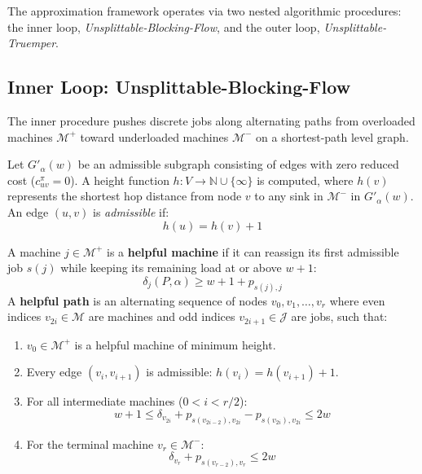 \documentclass{article}
\begin{document}
The approximation framework operates via two nested algorithmic procedures: the inner loop, \emph{Unsplittable-Blocking-Flow}, and the outer loop, \emph{Unsplittable-Truemper}.

\subsection{Inner Loop: Unsplittable-Blocking-Flow}
The inner procedure pushes discrete jobs along alternating paths from overloaded machines $\mathcal{M}^+$ toward underloaded machines $\mathcal{M}^-$ on a shortest-path level graph.

Let $G'_\alpha(w)$ be an admissible subgraph consisting of edges with zero reduced cost ($c_{uv}^\pi = 0$).
A height function $h: V \to \mathbb{N} \cup \{\infty\}$ is computed, where $h(v)$ represents the shortest hop distance from node $v$ to any sink in $\mathcal{M}^-$ in $G'_\alpha(w)$.
An edge $(u, v)$ is \emph{admissible} if:
\begin{equation}
h(u) = h(v) + 1
\end{equation}

\begin{definition}
A machine $j \in \mathcal{M}^+$ is a \textbf{helpful machine} if it can reassign its first admissible job $s(j)$ while keeping its remaining load at or above $w+1$:
\begin{equation}
\delta_j(P, \alpha) \ge w + 1 + p_{s(j), j}
\end{equation}
A \textbf{helpful path} is an alternating sequence of nodes $v_0, v_1, \dots, v_r$ where even indices $v_{2i} \in \mathcal{M}$ are machines and odd indices $v_{2i+1} \in \mathcal{J}$ are jobs, such that:
\begin{enumerate}
    \item $v_0 \in \mathcal{M}^+$ is a helpful machine of minimum height.
    \item Every edge $(v_i, v_{i+1})$ is admissible: $h(v_i) = h(v_{i+1}) + 1$.
    \item For all intermediate machines ($0 < i < r/2$):
    \begin{equation}
    w + 1 \le \delta_{v_{2i}} + p_{s(v_{2i-2}), v_{2i}} - p_{s(v_{2i}), v_{2i}} \le 2w
    \end{equation}
    \item For the terminal machine $v_r \in \mathcal{M}^-$:
    \begin{equation}
    \delta_{v_r} + p_{s(v_{r-2}), v_r} \le 2w
    \end{equation}
\end{enumerate}
\end{definition}
\end{document}
